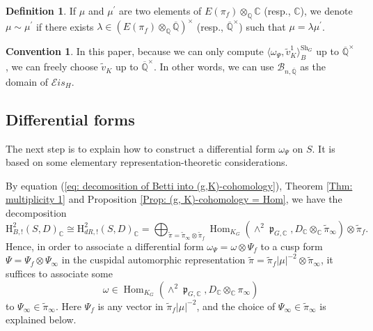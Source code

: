 \documentclass[11pt, a4paper]{amsart}
\theoremstyle{plain}
\theoremstyle{definition}
\newtheorem{definition}[theorem]{Definition}
\newtheorem{convention}[theorem]{Convention}
\numberwithin{equation}{section}
\def\CC{\mathbb{C}}
\def\QQ{\mathbb{Q}}
\DeclareMathOperator{\Hom}{Hom}
\DeclareMathOperator{\liep}{\mathfrak p}
\newcommand{\Sh}{\mathrm{Sh}}
\begin{document}
\begin{definition}
    If $\mu$ and $\mu^{\prime}$ are two elements of $E(\pi_f)\otimes_{\QQ}{\CC}$ (resp., $\CC$), we denote $\mu \sim \mu^{\prime}$ if there exists $\lambda \in (E(\pi_f) \otimes_{\QQ} \overline{\QQ})^{\times}$ (resp., $\overline{\QQ}^{\times}$) such that $\mu = \lambda \mu^{\prime}$. 
\end{definition}

\begin{convention}
    In this paper, because we can only compute $\langle \omega_{\Psi}, \tilde{v}_{K}^{1} \rangle_{B}^{\Sh_{G}}$ up to $\overline{\QQ}^{\times}$, we can freely choose $\tilde{v}_{K}$ up to $\overline{\QQ}^{\times}$. In other words, we can use $\mathcal{B}_{n, \overline{\QQ}}$ as the domain of $\mathcal{E}is_{H}$. 
\end{convention}

\subsection{Differential forms}
\label{SS: the test vector}

The next step is to explain how to construct a differential form $\omega_{\Psi}$ on $S$. It is based on some elementary representation-theoretic considerations. 

\par By equation (\ref{eq: decomosition of Betti into (g,K)-cohomology}), Theorem \ref{Thm: multiplicity 1} and Proposition \ref{Prop: (g, K)-cohomology = Hom}, we have the decomposition 
\begin{equation*}
     \mathrm{H}^{2}_{B, !}(S, D)_{\CC} \cong \mathrm{H}^{2}_{dR, !}(S, D)_{\CC} = \bigoplus_{\tilde{\pi} = \tilde{\pi}_{\infty} \otimes \tilde{\pi}_f} \Hom_{K_G}(\wedge^{2} \liep_{G, \CC}, D_{\CC} \otimes_{\CC} \tilde{\pi}_{\infty}) \otimes \tilde{\pi}_f. 
\end{equation*}
Hence, in order to associate a differential form $\omega_{\Psi} = \omega \otimes \Psi_{f}$ to a cusp form $\Psi = \Psi_{f} \otimes \Psi_{\infty}$ in the cuspidal automorphic representation  $\tilde{\pi} = \tilde{\pi}_{f}|\mu|^{-2} \otimes \tilde{\pi}_{\infty}$, it suffices to associate some
\begin{equation*}
    \omega \in \Hom_{K_G}(\wedge^{2} \liep_{G, \CC}, D_{\CC} \otimes_{\CC} \pi_{\infty})
\end{equation*}
to $\Psi_{\infty} \in \tilde{\pi}_{\infty}$. Here $\Psi_{f}$ is any vector in $\tilde{\pi}_{f} |\mu|^{-2}$, and the choice of $\Psi_{\infty} \in \tilde{\pi}_{\infty}$ is explained below. 
\end{document}
